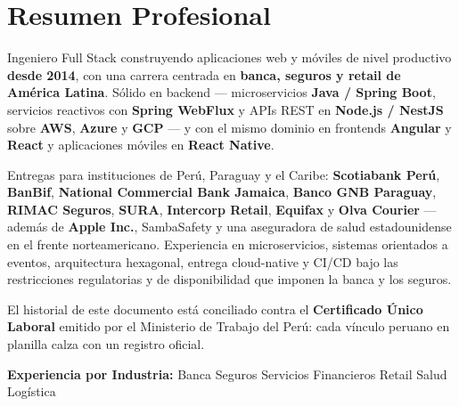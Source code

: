 
\section{Resumen Profesional}

Ingeniero Full Stack construyendo aplicaciones web y móviles de nivel productivo
\textbf{desde 2014}, con una carrera centrada en \textbf{banca, seguros y retail de América
Latina}. Sólido en backend --- microservicios \textbf{Java / Spring Boot}, servicios reactivos con
\textbf{Spring WebFlux} y APIs REST en \textbf{Node.js / NestJS} sobre \textbf{AWS},
\textbf{Azure} y \textbf{GCP} --- y con el mismo dominio en frontends \textbf{Angular} y
\textbf{React} y aplicaciones móviles en \textbf{React Native}.

\vspace{3pt}

Entregas para instituciones de Perú, Paraguay y el Caribe: \textbf{Scotiabank Perú},
\textbf{BanBif}, \textbf{National Commercial Bank Jamaica}, \textbf{Banco GNB Paraguay},
\textbf{RIMAC Seguros}, \textbf{SURA}, \textbf{Intercorp Retail}, \textbf{Equifax} y
\textbf{Olva Courier} --- además de \textbf{Apple Inc.}, SambaSafety y una aseguradora de salud
estadounidense en el frente norteamericano. Experiencia en microservicios, sistemas orientados a
eventos, arquitectura hexagonal, entrega cloud-native y CI/CD bajo las restricciones regulatorias
y de disponibilidad que imponen la banca y los seguros.

\vspace{3pt}

El historial de este documento está conciliado contra el \textbf{Certificado Único Laboral} emitido
por el Ministerio de Trabajo del Perú: cada vínculo peruano en planilla calza con un registro
oficial.

\vspace{4pt}
{\small\color{cvMuted}%
  \textbf{Experiencia por Industria:}\enspace%
  Banca\enspace\textbar\enspace
  Seguros\enspace\textbar\enspace
  Servicios Financieros\enspace\textbar\enspace
  Retail\enspace\textbar\enspace
  Salud\enspace\textbar\enspace
  Logística%
}
